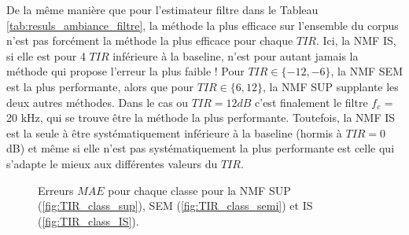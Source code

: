 De la même manière que pour l'estimateur filtre dans le Tableau \ref{tab:resuls_ambiance_filtre}, la méthode la plus efficace sur l'ensemble du corpus n'est pas forcément la méthode la plus efficace pour chaque $TIR$. Ici, la NMF IS, si elle est pour 4 $TIR$ inférieure à la baseline, n'est pour autant jamais la méthode qui propose l'erreur la plus faible ! Pour $TIR \in \lbrace -12, -6 \rbrace$, la NMF SEM est la plus performante, alors que pour $TIR\in \lbrace 6, 12 \rbrace$, la NMF SUP supplante les deux autres méthodes. Dans le cas ou $TIR = 12 dB$ c'est finalement le filtre $f_c$ = 20 kHz, qui se trouve être la méthode la plus performante. Toutefois, la NMF IS est la seule à être systématiquement inférieure à la baseline (hormis à $TIR = 0$ dB) et même si elle n'est pas systématiquement la plus performante est celle qui s'adapte le mieux aux différentes valeurs du $TIR$.\\

\begin{figure}%
\centering
{}%
\qquad
{}%
\qquad
{}%
\caption{Erreurs $MAE$ pour chaque classe pour la NMF SUP (\ref{fig:TIR_class_sup}), SEM (\ref{fig:TIR_class_semi}) et IS (\ref{fig:TIR_class_IS}).}
\end{figure}

